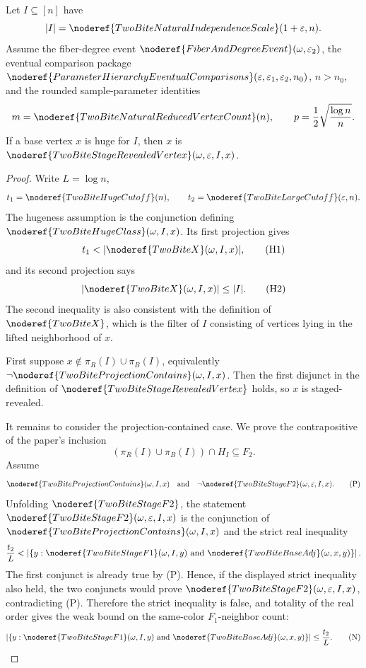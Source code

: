 \begin{helper}
Let \(I\subseteq[n]\) have
\[
|I|=\noderef{TwoBiteNaturalIndependenceScale}(1+\varepsilon,n).
\]
Assume the fiber-degree event
\(\noderef{FiberAndDegreeEvent}(\omega,\varepsilon_2)\), the eventual
comparison package
\(\noderef{ParameterHierarchyEventualComparisons}
(\varepsilon,\varepsilon_1,\varepsilon_2,n_0)\), \(n>n_0\), and the rounded
sample-parameter identities
\[
m=\noderef{TwoBiteNaturalReducedVertexCount}(n),\qquad
p=\frac12\sqrt{\frac{\log n}{n}}.
\]
If a base vertex \(x\) is huge for \(I\), then \(x\) is
\(\noderef{TwoBiteStageRevealedVertex}(\omega,\varepsilon,I,x)\).
\end{helper}
\begin{proof}
Write \(L=\log n\),
\[
t_1=\noderef{TwoBiteHugeCutoff}(n),\qquad
t_2=\noderef{TwoBiteLargeCutoff}(\varepsilon,n).
\]
The hugeness assumption is the conjunction defining
\(\noderef{TwoBiteHugeClass}(\omega,I,x)\).  Its first projection gives
\[
t_1<|\noderef{TwoBiteX}(\omega,I,x)|, \tag{H1}
\]
and its second projection says
\[
|\noderef{TwoBiteX}(\omega,I,x)|\le |I|. \tag{H2}
\]
The second inequality is also consistent with the definition of
\(\noderef{TwoBiteX}\), which is the filter of \(I\) consisting of vertices
lying in the lifted neighborhood of \(x\).

First suppose \(x\notin\pi_R(I)\cup\pi_B(I)\), equivalently
\(\neg\noderef{TwoBiteProjectionContains}(\omega,I,x)\).  Then the first
disjunct in the definition of
\(\noderef{TwoBiteStageRevealedVertex}\) holds, so \(x\) is staged-revealed.

It remains to consider the projection-contained case.  We prove the
contrapositive of the paper's inclusion
\[
(\pi_R(I)\cup\pi_B(I))\cap H_I\subseteq F_2.
\]
Assume
\[
\noderef{TwoBiteProjectionContains}(\omega,I,x)
\quad\text{and}\quad
\neg\noderef{TwoBiteStageF2}(\omega,\varepsilon,I,x).
\tag{P}
\]
Unfolding \(\noderef{TwoBiteStageF2}\), the statement
\(\noderef{TwoBiteStageF2}(\omega,\varepsilon,I,x)\) is the conjunction of
\(\noderef{TwoBiteProjectionContains}(\omega,I,x)\) and the strict real
inequality
\[
\frac{t_2}{L}<
\left|
\{y:\noderef{TwoBiteStageF1}(\omega,I,y)
      \text{ and }\noderef{TwoBiteBaseAdj}(\omega,x,y)\}
\right|.
\]
The first conjunct is already true by (P).  Hence, if the displayed strict
inequality also held, the two conjuncts would prove
\(\noderef{TwoBiteStageF2}(\omega,\varepsilon,I,x)\), contradicting (P).
Therefore the strict inequality is false, and totality of the real order gives
the weak bound on the same-color \(F_1\)-neighbor count:
\[
\left|
\{y:\noderef{TwoBiteStageF1}(\omega,I,y)
      \text{ and }\noderef{TwoBiteBaseAdj}(\omega,x,y)\}
\right|
\le \frac{t_2}{L}. \tag{N}
\]


\end{proof}
